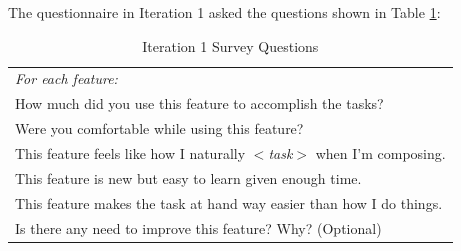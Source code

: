 		The questionnaire in Iteration 1 asked the questions shown in Table \ref{tab:it1-survey}: 
		\begin{longtable}{|p{14cm}|}
			\caption{Iteration 1 Survey Questions} \label{tab:it1-survey} \\ 
		  	\hline
		  	\textit{For each feature:} \\ 
		  	\hspace{6mm}How much did you use this feature to accomplish the tasks? \\
			\hspace{6mm}Were you comfortable while using this feature? \\
			\hspace{6mm}This feature feels like how I naturally \textit{$<$task$>$} when I’m composing. \\
			\hspace{6mm}This feature is new but easy to learn given enough time. \\
			\hspace{6mm}This feature makes the task at hand way easier than how I do things. \\
			\hspace{6mm}Is there any need to improve this feature? Why? (Optional) \\
		  	\hline
		\end{longtable}

